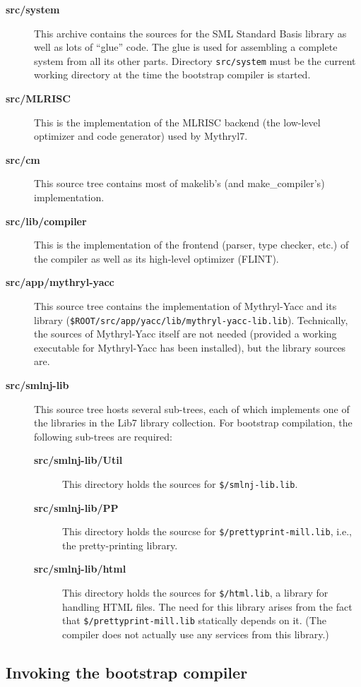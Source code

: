 \begin{description}
\item[{\bf src/system}] This archive contains the sources for the SML
Standard Basis library as well as lots of ``glue'' code.  The glue is
used for assembling a complete system from all its other parts.
Directory {\tt src/system} must be the current working directory at
the time the bootstrap compiler is started.
\item[{\bf src/MLRISC}] This is the implementation of the MLRISC
backend (the low-level optimizer and code generator) used by Mythryl7.
\item[{\bf src/cm}] This source tree contains most of makelib's (and make_compiler's)
implementation.
\item[{\bf src/lib/compiler}] This is the implementation of the frontend
(parser, type checker, etc.) of the compiler as well as its high-level
optimizer (FLINT).
\item[{\bf src/app/mythryl-yacc}] This source tree contains the implementation
of Mythryl-Yacc and its library ({\tt \$ROOT/src/app/yacc/lib/mythryl-yacc-lib.lib}).
Technically, the sources of Mythryl-Yacc itself are not needed (provided a
working executable for Mythryl-Yacc has been installed), but the library
sources are.
\item[{\bf src/smlnj-lib}] This source tree hosts several sub-trees,
each of which implements one of the libraries in the Lib7 library
collection.  For bootstrap compilation, the following sub-trees are
required:
\begin{description}
\item[{\bf src/smlnj-lib/Util}] This directory holds the sources for
{\tt \$/smlnj-lib.lib}.
\item[{\bf src/smlnj-lib/PP}] This directory holds the sourcse for
{\tt \$/prettyprint-mill.lib}, i.e., the pretty-printing library.
\item[{\bf src/smlnj-lib/html}] This directory holds the sources for
{\tt \$/html.lib}, a library for handling HTML files.  The need for
this library arises from the fact that {\tt \$/prettyprint-mill.lib} statically
depends on it.  (The compiler does not actually use any services from
this library.)
\end{description}
\end{description}

\subsection{Invoking the bootstrap compiler}


